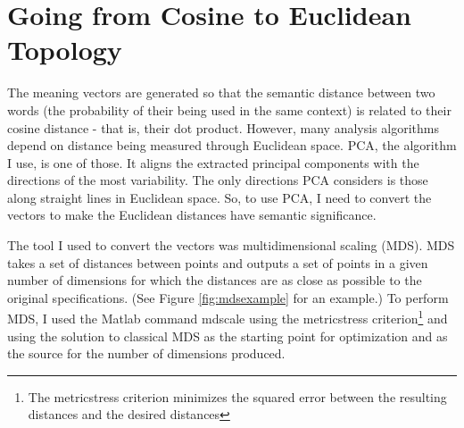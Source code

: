 \section{Going from Cosine to Euclidean Topology}

The meaning vectors are generated so that the semantic distance between two 
words (the probability of their being used in the same context) is related to 
their cosine distance - that is, their dot product. However, many analysis 
algorithms depend on distance being measured through Euclidean space. PCA, 
the algorithm I use, is one of those. It aligns the 
extracted principal components with the directions of the most variability. The 
only directions PCA considers is those along straight lines in Euclidean space. 
So, to use PCA, I need to convert the vectors to make the Euclidean distances 
have semantic significance. 

The tool I used to convert the vectors was multidimensional scaling (MDS). MDS 
takes a set of distances between points and outputs a set of points in a given 
number of dimensions for which the distances are as close as possible to the 
original specifications. (See Figure \ref{fig:mdsexample} for an example.) To 
perform MDS, I used the Matlab command mdscale using the metricstress 
criterion\footnote{The metricstress criterion minimizes the squared error 
between the resulting distances and the desired distances} and using the 
solution to classical MDS as the starting point for optimization and as the 
source for the number of dimensions produced.\citep{Matlab2012a}

